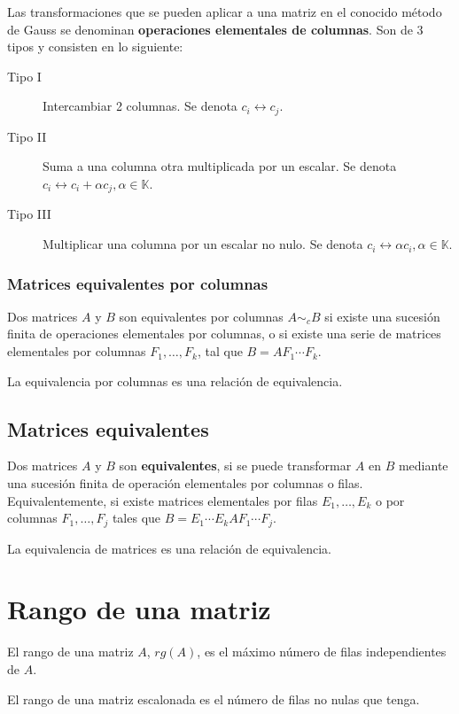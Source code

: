 Las transformaciones que se pueden aplicar a una matriz en el conocido método de Gauss se denominan \textbf{operaciones elementales 
de columnas}. Son de 3 tipos y consisten en lo siguiente:
\begin{description}
 \item[Tipo I] Intercambiar 2 columnas. Se denota $c_i \leftrightarrow c_j$.
 \item[Tipo II] Suma a una columna otra multiplicada por un escalar. Se denota $c_i \leftrightarrow c_i + \alpha c_j, \alpha \in \mathbb{K}$.
 \item[Tipo III] Multiplicar una columna por un escalar no nulo. Se denota $c_i  \leftrightarrow \alpha c_i, \alpha \in \mathbb{K}$.
\end{description}

\subsubsection{Matrices equivalentes por columnas}

Dos matrices $A$ y $B$ son equivalentes por columnas $A \sim_c B$ si existe una sucesión finita de operaciones elementales por columnas, o si existe una serie de matrices elementales por columnas $F_1,\ldots,F_k$, tal que $B=A F_1\cdots F_k$.


La equivalencia por columnas es una relación de equivalencia.


\subsection{Matrices equivalentes}

Dos matrices $A$ y $B$ son \textbf{equivalentes}, si se puede transformar $A$ en $B$ mediante una sucesión finita de operación elementales por columnas o filas. Equivalentemente, si existe matrices elementales por filas $E_1,\ldots,E_k$ o por columnas $F_1,\ldots,F_j$ tales que $B=E_1 \cdots E_k A F_1 \cdots F_j$.


La equivalencia de matrices es una relación de equivalencia.


\section{Rango de una matriz}

El rango de una matriz $A$, $rg(A)$, es el máximo número de filas independientes de $A$.


El rango de una matriz escalonada es el número de filas no nulas que tenga.


